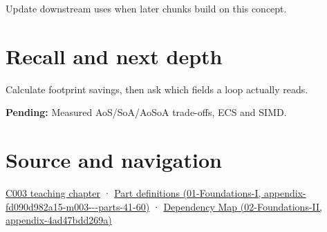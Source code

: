 Update downstream uses when later chunks build on this concept.

\section{Recall and next depth}\label{appendix-5522ad176ca0-recall-and-next-depth}

Calculate footprint savings, then ask which fields a loop actually reads.

\textbf{Pending:} Measured AoS/SoA/AoSoA trade-offs, ECS and SIMD.

\section{Source and navigation}\label{appendix-5522ad176ca0-source-and-navigation}

\href{Continuous\%20Notes/Computing\%20Foundations\%20-\%20From\%20Bits\%20to\%20C++\%20and\%20Systems\%20APIs\#Where\%20the\%20bytes\%20live}{C003 teaching chapter} · \href{../01-Foundations-I/main.pdf\#nameddest=appendix-fd090d982a15-m003---parts-41-60}{Part definitions (01-Foundations-I, appendix-fd090d982a15-m003-\/-\/-parts-41-60)} · \href{../02-Foundations-II/main.pdf\#nameddest=appendix-4ad47bdd269a}{Dependency Map (02-Foundations-II, appendix-4ad47bdd269a)}
